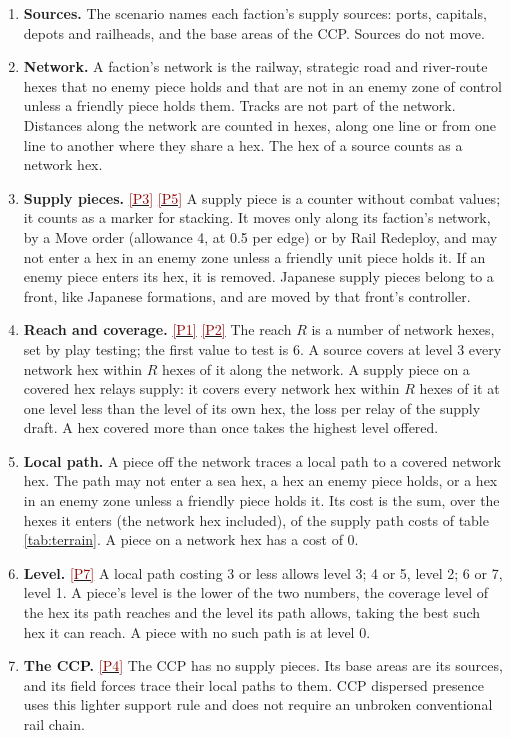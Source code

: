 \documentclass[11pt]{article}
\newcommand{\ptest}[1]{\hyperlink{ptest}{\textcolor{darkred}{[P#1]}}}
\begin{document}
\begin{enumerate}
\item \textbf{Sources.} The scenario names each faction's supply sources: ports, capitals, depots and railheads, and the base areas of the CCP. Sources do not move.
\item \textbf{Network.} A faction's network is the railway, strategic road and river-route hexes that no enemy piece holds and that are not in an enemy zone of control unless a friendly piece holds them. Tracks are not part of the network. Distances along the network are counted in hexes, along one line or from one line to another where they share a hex. The hex of a source counts as a network hex.
\item \textbf{Supply pieces.} \ptest{3} \ptest{5} A supply piece is a counter without combat values; it counts as a marker for stacking. It moves only along its faction's network, by a Move order (allowance 4, at 0.5 per edge) or by Rail Redeploy, and may not enter a hex in an enemy zone unless a friendly unit piece holds it. If an enemy piece enters its hex, it is removed. Japanese supply pieces belong to a front, like Japanese formations, and are moved by that front's controller.
\item \textbf{Reach and coverage.} \ptest{1} \ptest{2} The reach $R$ is a number of network hexes, set by play testing; the first value to test is 6. A source covers at level 3 every network hex within $R$ hexes of it along the network. A supply piece on a covered hex relays supply: it covers every network hex within $R$ hexes of it at one level less than the level of its own hex, the loss per relay of the supply draft. A hex covered more than once takes the highest level offered.
\item \textbf{Local path.} A piece off the network traces a local path to a covered network hex. The path may not enter a sea hex, a hex an enemy piece holds, or a hex in an enemy zone unless a friendly piece holds it. Its cost is the sum, over the hexes it enters (the network hex included), of the supply path costs of table \ref{tab:terrain}. A piece on a network hex has a cost of 0.
\item \textbf{Level.} \ptest{7} A local path costing 3 or less allows level 3; 4 or 5, level 2; 6 or 7, level 1. A piece's level is the lower of the two numbers, the coverage level of the hex its path reaches and the level its path allows, taking the best such hex it can reach. A piece with no such path is at level 0.
\item \textbf{The CCP.} \ptest{4} The CCP has no supply pieces. Its base areas are its sources, and its field forces trace their local paths to them. CCP dispersed presence uses this lighter support rule and does not require an unbroken conventional rail chain.

\end{enumerate}
\end{document}
